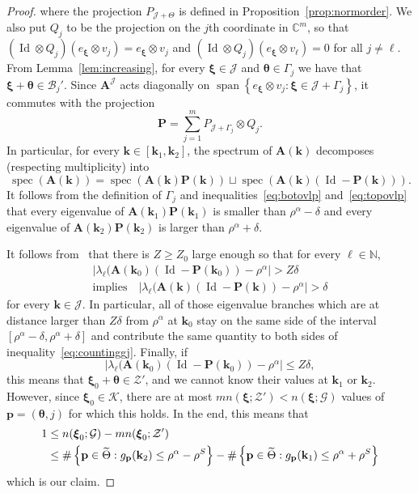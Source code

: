 \documentclass[AHL,Unicode,longabstracts,published]{cedram}
\DeclareMathOperator{\spann}{span}
\DeclareMathOperator{\spec}{spec}
\DeclareMathOperator{\Id}{Id}
\newcommand{\C}{\mathbb C}
\newcommand{\N}{\mathbb N}
\newcommand{\CB}{\mathcal{B}}
\newcommand{\CG}{\mathcal{G}}
\newcommand{\CJ}{\mathcal{J}}
\newcommand{\CK}{\mathcal{K}}
\newcommand{\CZ}{\mathcal{Z}}
\newcommand{\btheta}{\boldsymbol \theta}
\newcommand{\bxi}{\boldsymbol \xi}
\newcommand{\BA}{\mathbf A}
\newcommand{\BP}{\mathbf P}
\newcommand{\bk}{\mathbf k}
\newcommand{\bp}{\mathbf p}
\newcommand{\abs}[1]{\left\lvert #1 \right\rvert}
\newcommand{\set}[1]{\left\{ #1 \right\}}
\let\oldtilde\tilde
\renewcommand*{\tilde}[1]{\mathchoice{\widetilde{#1}}{\widetilde{#1}}{\oldtilde{#1}}{\oldtilde{#1}}}
\begin{document}
\begin{proof}
where the projection $P_{\CJ + \Theta}$ is defined in Proposition~\ref{prop:normorder}. We also put $Q_j$ to be the projection on the $j$th coordinate in $\C^m$, so that $(\Id \otimes Q_j)(e_{\bxi}\otimes v_j) = e_{\bxi} \otimes v_j$ and $(\Id \otimes Q_j)(e_{\bxi} \otimes v_\ell) = 0$ for all $j \ne \ell$. From Lemma~\ref{lem:increasing}, for every $\bxi \in \CJ$ and $\btheta \in \Gamma_j$ we have that $\bxi + \btheta \in \CB_j'$. Since $\BA^\CJ$ acts diagonally on $\spann\set{e_{\bxi} \otimes v_j : \bxi \in \CJ +
\Gamma_j}$, it commutes with the projection
\begin{equation}
\BP = \sum_{j=1}^m P_{\CJ + \Gamma_j} \otimes Q_j.
\end{equation}
In particular, for every $\bk \in [\bk_1,\bk_2]$, the spectrum of $\BA(\bk)$ decomposes (respecting multiplicity) into
\begin{equation}
\spec(\BA(\bk)) = \spec(\BA(\bk) \BP(\bk)) \sqcup \spec(\BA(\bk) (\Id -
\BP(\bk))).
\end{equation}
It follows from the definition of $\Gamma_j$ and inequalities~\eqref{eq:botovlp} and~\eqref{eq:topovlp} that every eigenvalue of $\BA(\bk_1) \BP(\bk_1)$ is smaller than $\rho^\alpha - \delta$ and every eigenvalue of $\BA(\bk_2)
\BP(\bk_2)$ is larger than $\rho^\alpha + \delta$.

It follows from~\cite[Theorem~3.6]{ParSob2010} that there is $Z \ge Z_0$ large enough so that for every $\ell \in \N$,
\begin{multline}
\abs{\lambda_\ell(\BA(\bk_0) (\Id - \BP(\bk_0)) - \rho^\alpha } > Z
\delta \\
\text{implies} \quad
\abs{\lambda_\ell(\BA(\bk) (\Id - \BP(\bk)) - \rho^\alpha } >
\delta
\end{multline}
for every $\bk \in \CJ$. In particular, all of those eigenvalue branches which are at distance larger than $Z\delta$ from $\rho^\alpha$ at $\bk_0$ stay on the same side of the interval $[\rho^\alpha - \delta, \rho^\alpha + \delta]$ and contribute the same quantity to both sides of inequality~\eqref{eq:countinggj}. Finally, if
\begin{equation}
\abs{\lambda_\ell(\BA(\bk_0) (\Id - \BP(\bk_0)) - \rho^\alpha } \le Z
\delta,
\end{equation}
this means that $\bxi_0 + \btheta \in \CZ'$, and we cannot know their values at $\bk_1$ or $\bk_2$. However, since $\bxi_0 \in \CK$, there are at most $m n(\bxi;\CZ') < n(\bxi;\CG)$ values of $\bp = (\btheta,j)$ for which this holds. In the end, this means that
\begin{equation}
\begin{aligned}
1 &\le n(\bxi_0;\CG) - m n(\bxi_0;\CZ') \\&\le
\#\set{\bp \in \tilde \Theta : g_\bp(\bk_2) \le \rho^\alpha - \rho^S } -
\#\set{\bp \in \tilde \Theta : g_\bp(\bk_1) \le \rho^\alpha + \rho^S}
\end{aligned}
\end{equation}
which is our claim.
\end{proof}
\end{document}
